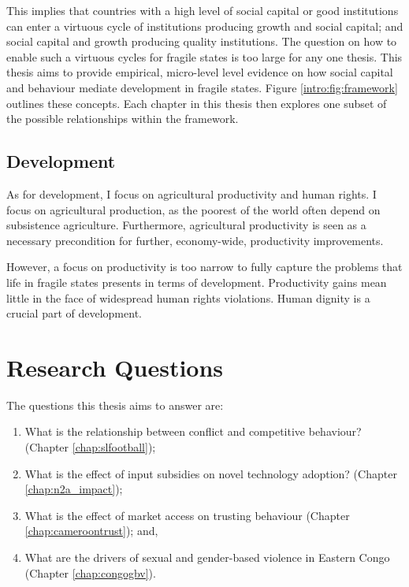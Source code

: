 This implies that countries with a high level of social capital or good institutions can enter a virtuous cycle of institutions producing growth and social capital; and social capital and growth producing quality institutions. The question on how to enable such a virtuous cycles for fragile states is too large for any one thesis. This thesis aims to provide empirical, micro-level level evidence on how social capital and behaviour mediate development in fragile states. Figure \ref{intro:fig:framework} outlines these concepts. Each chapter in this thesis then explores one subset of the possible relationships within the framework.

\subsection{Development}
As for development, I focus on agricultural productivity and human rights. I focus on agricultural production, as the poorest of the world often depend on subsistence agriculture. Furthermore, agricultural productivity is seen as a necessary precondition for further, economy-wide, productivity improvements.  

However, a focus on productivity is too narrow to fully capture the problems that life in fragile states presents in terms of development. Productivity gains mean little in the face of widespread human rights violations. Human dignity is a crucial part of development.


\section{Research Questions}
The questions this thesis aims to answer are:
\begin{enumerate}
	\item What is the relationship between conflict and competitive behaviour? (Chapter \ref{chap:slfootball});
	\item What is the effect of input subsidies on novel technology adoption? (Chapter \ref{chap:n2a_impact});
	\item What is the effect of market access on trusting behaviour (Chapter \ref{chap:cameroontrust}); and,
	\item What are the drivers of sexual and gender-based violence in Eastern Congo (Chapter \ref{chap:congogbv}).
\end{enumerate}

